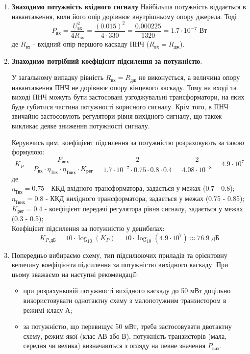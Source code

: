 \documentclass[main.tex]{subfiles}
\begin{document}
\begin{enumerate}
\item \textbf{Знаходимо потужність вхідного сигналу} \newline
Найбільша потужність віддається в навантаження, коли його опір дорівнює
внутрішньому опору джерела. Тоді
\[
P_\text{вх} = \frac{U_\text{вх}^2}{4R_\text{вх}} = \frac{(0.015)^2}{4 \cdot 330} = \frac{0.000225}{1320} = 1.7 \cdot 10^{-7} \text{ Вт}
\]
де $R_{\text{вх}}$ - вхідний опір першого каскаду ПНЧ ($R_{\text{вх}} = R_{\text{дж}}$).

\item \textbf{Знаходимо потрібний коефіцієнт підсилення за потужністю}.

У загальному випадку рівність $R_{\text{вх}} = R_{\text{дж}}$ не виконується, а величина опору навантаження ПНЧ не дорівнює опору кінцевого каскаду. Тому на вході та виході
ПНЧ можуть бути застосовані узгоджувальні трансформатори, на яких буде
губитися частина потужності корисного сигналу. Крім того, в ПНЧ звичайно
застосовують регулятори рівня вихідного сигналу, що також викликає деяке
зниження потужності сигналу.

Керуючись цим, коефіцієнт підсилення за потужністю розраховують за
такою формулою:
\[
K_P = \frac{P_\text{вих}}{P_\text{вх} \cdot \eta_\text{Твх} \cdot \eta_\text{Твих} \cdot K_\text{рег}} = \frac{2}{1.7 \cdot 10^{-7} \cdot 0.75 \cdot 0.8 \cdot 0.4} = \frac{2}{4.08 \cdot 10^{-8}} = 4.9 \cdot 10^7
\]
де\\
$\eta_{\text{Твх}} = 0.75$ - ККД вхідного трансформатора, задається у межах (0.7 - 0.8);\\
$\eta_{\text{Твих}} = 0.8$ - ККД вихідного трансформатора, задається у межах (0.75 - 0.85);\\
$K_\text{рег} = 0.4$ - коефіцієнт передачі регулятора рівня сигналу, задається у межах (0.3 - 0.5);\\

Коефіцієнт підсилення за потужністю у децибелах:
\[
K_{P,\text{дБ}} = 10 \cdot \log_{10}(K_P) = 10 \cdot \log_{10}(4.9 \cdot 10^7) \approx 76.9 \text{ дБ}
\]

\item Попередньо вибираємо схему, тип підсилюючих приладів та
орієнтовну величину коефіцієнта підсилення за потужністю вихідного каскаду.
При цьому зважаємо на наступні рекомендації:
\begin{itemize}
    \item при розрахунковій потужності вихідного каскаду до 50 мВт доцільно
використовувати однотактну схему з малопотужним транзистором в режимі класу
А;
    \item за потужністю, що перевищує 50 мВт, треба застосовувати двотактну
схему, режим якої (клас АВ або В), потужність транзисторів (мала, середня чи
велика) визначаються з огляду на певне значення $P_{\text{вих}}$.
\end{itemize}


\end{enumerate}
\end{document}
